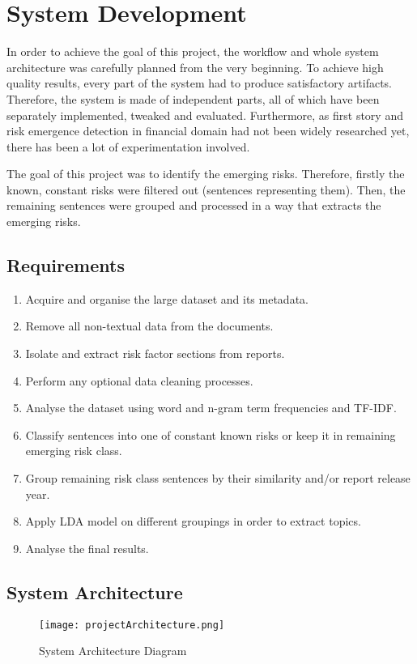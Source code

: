 \chapter{System Development}
In order to achieve the goal of this project, the workflow and whole system architecture was carefully planned from the very beginning. To achieve high quality results, every part of the system had to produce satisfactory artifacts. Therefore, the system is made of independent parts, all of which have been separately implemented, tweaked and evaluated. Furthermore, as first story and risk emergence detection in financial domain had not been widely researched yet, there has been a lot of experimentation involved.

The goal of this project was to identify the emerging risks. Therefore, firstly the known, constant risks were filtered out (sentences representing them). Then, the remaining sentences were grouped and processed in a way that extracts the emerging risks.

\section{Requirements}
\begin{enumerate}
\item Acquire and organise the large dataset and its metadata.
\item Remove all non-textual data from the documents.
\item Isolate and extract risk factor sections from reports.
\item Perform any optional data cleaning processes.
\item Analyse the dataset using word and n-gram term frequencies and TF-IDF.
\item Classify sentences into one of constant known risks or keep it in remaining emerging risk class.
\item Group remaining risk class sentences by their similarity and/or report release year.
\item Apply LDA model on different groupings in order to extract topics.
\item Analyse the final results.
\end{enumerate}

\section{System Architecture}
\begin{figure}[H]
\begin{center}
\texttt{[image: projectArchitecture.png]}
\label{fig:architecture}
\caption{System Architecture Diagram}
\end{center}
\end{figure}

